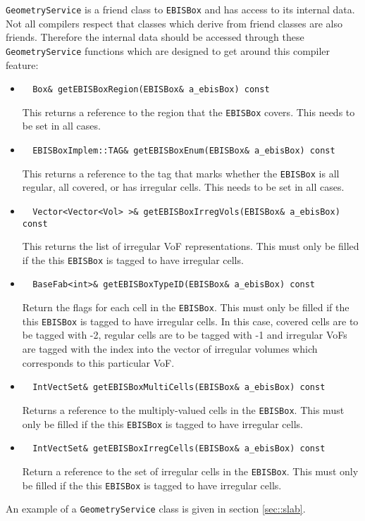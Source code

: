 {\tt GeometryService} is a friend class to {\tt EBISBox} 
and has access to its internal data.
Not all compilers respect that classes which derive from
friend classes are also friends.
Therefore the internal data should be accessed through these
{\tt GeometryService} functions which are designed to get
around this compiler feature:
\begin{itemize}
\item
\begin{verbatim}
  Box& getEBISBoxRegion(EBISBox& a_ebisBox) const
\end{verbatim}
This returns a reference to the region that the {\tt EBISBox} covers.
This needs to be set in all cases.

\item
\begin{verbatim}
  EBISBoxImplem::TAG& getEBISBoxEnum(EBISBox& a_ebisBox) const
\end{verbatim}
This returns a reference to the tag that marks whether the 
{\tt EBISBox} is all regular, all covered, or has irregular cells.
This needs to be set in all cases.

\item
\begin{verbatim}
  Vector<Vector<Vol> >& getEBISBoxIrregVols(EBISBox& a_ebisBox) const
\end{verbatim}
This returns the list of irregular VoF representations.  
This must only be filled if the this {\tt EBISBox} is tagged to have
irregular cells.

\item
\begin{verbatim}
  BaseFab<int>& getEBISBoxTypeID(EBISBox& a_ebisBox) const
\end{verbatim}
Return the flags for each cell in the {\tt EBISBox}.
This must only be filled if the this {\tt EBISBox} is tagged to have
irregular cells.
In this case, covered cells are to be tagged with -2, regular
cells are to be tagged  with  -1 and irregular VoFs are tagged
with the index into the vector of irregular volumes which corresponds
to this particular VoF.

\item
\begin{verbatim}
  IntVectSet& getEBISBoxMultiCells(EBISBox& a_ebisBox) const
\end{verbatim}
Returns a reference to the multiply-valued cells in the {\tt EBISBox}.
This must only be filled if the this {\tt EBISBox} is tagged to have
irregular cells.

\item
\begin{verbatim}
  IntVectSet& getEBISBoxIrregCells(EBISBox& a_ebisBox) const
\end{verbatim}
Return a reference to the set of irregular cells in the {\tt EBISBox}.
This must only be filled if the this {\tt EBISBox} is tagged to have
irregular cells.
\end{itemize}
An example of a {\tt GeometryService} class is given in 
section \ref{sec::slab}.
